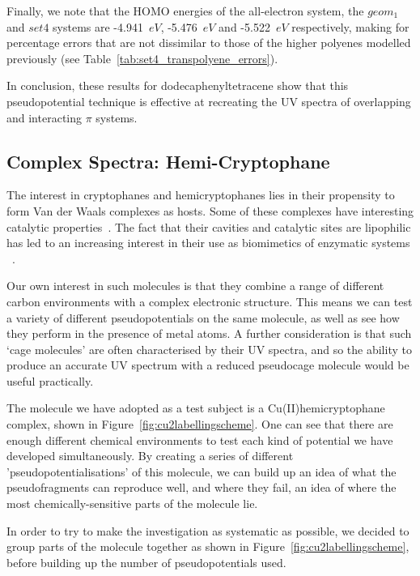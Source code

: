 \documentclass[aip,reprint,nofootinbib]{revtex4-1}
\begin{document}
Finally, we note that the HOMO energies of the all-electron system, the $geom_1$ and $set4$ systems are -4.941~$eV$, -5.476~$eV$ and -5.522~$eV$ respectively, making for percentage errors that are not dissimilar to those of the higher polyenes modelled previously (see Table~\ref{tab:set4_transpolyene_errors}).

In conclusion, these results for dodecaphenyltetracene show that this pseudopotential technique is effective at recreating the UV spectra of overlapping and interacting $\pi$ systems.

\subsection{Complex Spectra: Hemi-Cryptophane}

The interest in cryptophanes and hemicryptophanes lies in their propensity to form Van der Waals complexes as hosts. Some of these complexes have interesting catalytic properties~\cite{ikbal_2019}. The fact that their cavities and catalytic sites are lipophilic has led to an increasing interest in their use as biomimetics of enzymatic systems ~\cite{perraud_2013, gosse_2016}. 

Our own interest in such molecules is that they combine a range of different carbon environments with a complex electronic structure. This means we can test a variety of different pseudopotentials on the same molecule, as well as see how they perform in the presence of metal atoms. A further consideration is that such `cage molecules' are often characterised by their UV spectra, and so the ability to produce an accurate UV spectrum with a reduced pseudocage molecule would be useful practically.

The molecule we have adopted as a test subject is a Cu(II)hemicryptophane complex, shown in Figure~\ref{fig:cu2labellingscheme}. One can see that there are enough different chemical environments to test each kind of potential we have developed simultaneously. By creating a series of different 'pseudopotentialisations' of this molecule, we can build up an idea of what the pseudofragments can reproduce well, and where they fail, an idea of where the most chemically-sensitive parts of the molecule lie.

In order to try to make the investigation as systematic as possible, we decided to group parts of the molecule together as shown in Figure~\ref{fig:cu2labellingscheme}, before building up the number of pseudopotentials used. 
\end{document}
